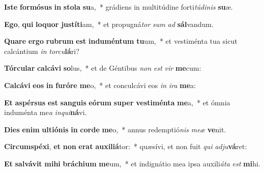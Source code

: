 \item \textbf{Is}\textbf{te} \textbf{for}\textbf{mó}\textbf{sus} \textbf{in} \textbf{sto}\textbf{la} \textbf{su}a,~* grádiens in multitúdine forti\textit{tú}\textit{di}\textit{nis} \textbf{su}æ.
\item \textbf{E}\textbf{go}, \textbf{qui} \textbf{lo}\textbf{quor} \textbf{jus}\textbf{tí}\textbf{ti}am,~* et propugná\textit{tor} \textit{sum} \textit{ad} \textbf{sál}vandum.
\item \textbf{Qua}\textbf{re} \textbf{er}\textbf{go} \textbf{ru}\textbf{brum} \textbf{est} \textbf{ind}\textbf{u}\textbf{mén}\textbf{tum} \textbf{tu}um,~* et vestiménta tua sicut calcántium \textit{in} \textit{tor}\textit{cu}\textbf{lá}ri?
\item \textbf{Tór}\textbf{cu}\textbf{lar} \textbf{cal}\textbf{cá}\textbf{vi} \textbf{so}lus,~* et de Géntibus \textit{non} \textit{est} \textit{vir} \textbf{me}cum:
\item \textbf{Cal}\textbf{cá}\textbf{vi} \textbf{e}\textbf{os} \textbf{in} \textbf{fu}\textbf{ró}\textbf{re} \textbf{me}o,~* et conculcávi eos \textit{in} \textit{i}\textit{ra} \textbf{me}a:
\item \textbf{Et} \textbf{a}\textbf{spér}\textbf{sus} \textbf{est} \textbf{san}\textbf{guis} \textbf{e}\textbf{ó}\textbf{rum} \textbf{su}\textbf{per} \textbf{ves}\textbf{ti}\textbf{mén}\textbf{ta} \textbf{me}a,~* et ómnia induménta me\textit{a} \textit{in}\textit{qui}\textbf{ná}vi.
\item \textbf{Di}\textbf{es} \textbf{e}\textbf{nim} \textbf{ul}\textbf{ti}\textbf{ó}\textbf{nis} \textbf{in} \textbf{cor}\textbf{de} \textbf{me}o,~* annus redemptió\textit{nis} \textit{me}\textit{æ} \textbf{ve}nit.
\item \textbf{Cir}\textbf{cum}\textbf{spé}\textbf{xi}, \textbf{et} \textbf{non} \textbf{e}\textbf{rat} \textbf{au}\textbf{xi}\textbf{li}\textbf{á}tor:~* quæsívi, et non fuit \textit{qui} \textit{ad}\textit{ju}\textbf{vá}ret:
\item \textbf{Et} \textbf{sal}\textbf{vá}\textbf{vit} \textbf{mi}\textbf{hi} \textbf{brá}\textbf{chi}\textbf{um} \textbf{me}um,~* et indignátio mea ipsa auxili\textit{á}\textit{ta} \textit{est} \textbf{mi}hi.

